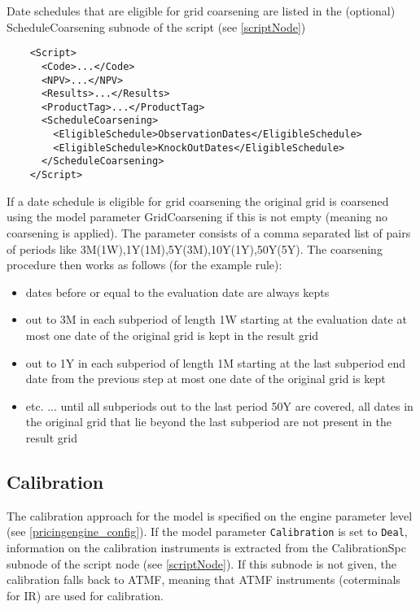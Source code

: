 Date schedules that are eligible for grid coarsening are listed in the (optional) ScheduleCoarsening subnode of the
script (see \ref{scriptNode})

\begin{verbatim}
    <Script>
      <Code>...</Code>
      <NPV>...</NPV>
      <Results>...</Results>
      <ProductTag>...</ProductTag>
      <ScheduleCoarsening>
        <EligibleSchedule>ObservationDates</EligibleSchedule>
        <EligibleSchedule>KnockOutDates</EligibleSchedule>
      </ScheduleCoarsening>
    </Script>
\end{verbatim}

If a date schedule is eligible for grid coarsening the original grid is coarsened using the model parameter
GridCoarsening if this is not empty (meaning no coarsening is applied). The parameter consists of a comma separated list
of pairs of periods like 3M(1W),1Y(1M),5Y(3M),10Y(1Y),50Y(5Y). The coarsening procedure then works as follows (for the
example rule):

\begin{itemize}
\item dates before or equal to the evaluation date are always kepts
\item out to 3M in each subperiod of length 1W starting at the evaluation date at most one date of the original grid is
  kept in the result grid
\item out to 1Y in each subperiod of length 1M starting at the last subperiod end date from the previous step at most
  one date of the original grid is kept
\item etc. ... until all subperiods out to the last period 50Y are covered, all dates in the original grid that lie
  beyond the last subperiod are not present in the result grid
\end{itemize}

\subsection{Calibration}\label{calibration}

The calibration approach for the model is specified on the engine parameter level (see \ref{pricingengine_config}). If
the model parameter \verb+Calibration+ is set to \verb+Deal+, information on the calibration instruments is extracted
from the CalibrationSpc subnode of the script node (see \ref{scriptNode}). If this subnode is not given, the calibration
falls back to ATMF, meaning that ATMF instruments (coterminals for IR) are used for calibration.

